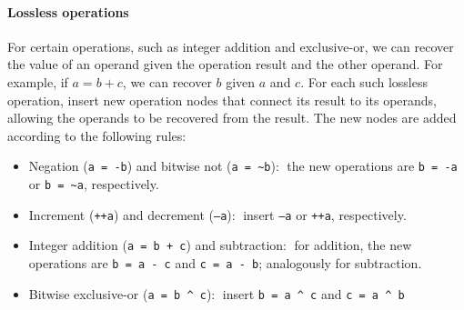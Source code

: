 \paragraph{Lossless operations} For certain operations, such as integer addition and exclusive-or, we can recover the value of an operand given the operation result and the other operand. For example, if $a=b+c$, we can recover $b$ given $a$ and $c$. For each such lossless operation, insert new operation nodes that connect its result to its operands, allowing the operands to be recovered from the result. The new nodes are added according to the following rules:
\begin{itemize}
	\item Negation (\texttt{a = -b}) and bitwise not (\texttt{a = \textasciitilde b}):$\;$ the new operations are  \texttt{b = -a} or \texttt{b = \textasciitilde a}, respectively.
	
	\item Increment (\texttt{++a}) and decrement (\texttt{--a}):$\;$ insert \texttt{--a} or \texttt{++a}, respectively.
	
	\item Integer addition (\texttt{a = b + c}) and subtraction:$\;$ for addition, the new operations are \texttt{b = a - c} and \texttt{c = a - b}; analogously for subtraction.
	
	\item Bitwise exclusive-or (\texttt{a = b \textasciicircum{ }c}):$\;$ insert \texttt{b = a \textasciicircum{ }c} and \texttt{c = a \textasciicircum{ }b}
\end{itemize}

